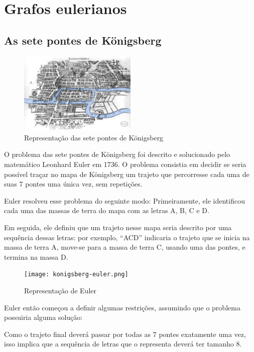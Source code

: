 \chapter{Grafos eulerianos}

\section{As sete pontes de Königsberg}

\begin{figure} 
    \centering
    \includegraphics[width=0.5\textwidth]{konigsberg.png}
    \caption{Representação das sete pontes de Königsberg}
\end{figure}

O problema das sete pontes de Kö\-nigsberg foi des\-crito e solucio\-nado pelo matemático Leonhard Eu\-ler em 1736. 
O problema consistia em decidir se seria possível traçar no mapa de Königsberg um trajeto que percorresse cada uma de suas 7 pon\-tes uma única vez, sem repetições.

Euler resolveu esse problema do seguinte modo: 
Primeiramente, ele identificou cada uma das massas de terra do mapa com as letras A, B, C e D.

Em seguida, ele definiu que um trajeto nesse mapa seria descrito por uma sequência dessas letras: por exemplo, ``ACD'' indicaria o trajeto que se inicia na massa de terra A, move-se para a massa de terra C, usando uma das pontes, e termina na massa D.

\begin{figure} 
    \centering
    \texttt{[image: konigsberg-euler.png]}
    \caption{Representação de Euler}
	\label{konigsberg-euler}
\end{figure}

Euler então começou a definir algumas restrições, assumindo que o problema possuiria alguma solução:

Como o trajeto final deverá passar por todas as 7 pontes exatamente uma vez, isso implica que a sequência de letras que o representa deverá ter tamanho 8.

